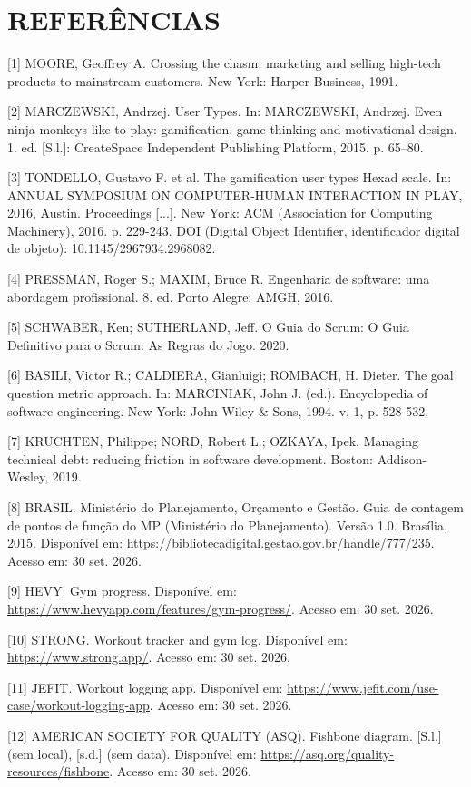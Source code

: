\clearpage
\section*{REFERÊNCIAS}

[1] MOORE, Geoffrey A. Crossing the chasm: marketing and selling high-tech products to mainstream customers. New York: Harper Business, 1991.

[2] MARCZEWSKI, Andrzej. User Types. In: MARCZEWSKI, Andrzej. Even ninja monkeys like to play: gamification, game thinking and motivational design. 1. ed. [S.l.]: CreateSpace Independent Publishing Platform, 2015. p. 65--80.

[3] TONDELLO, Gustavo F. et al. The gamification user types Hexad scale. In: ANNUAL SYMPOSIUM ON COMPUTER-HUMAN INTERACTION IN PLAY, 2016, Austin. Proceedings [...]. New York: ACM (Association for Computing Machinery), 2016. p. 229-243. DOI (Digital Object Identifier, identificador digital de objeto): 10.1145/2967934.2968082.

[4] PRESSMAN, Roger S.; MAXIM, Bruce R. Engenharia de software: uma abordagem profissional. 8. ed. Porto Alegre: AMGH, 2016.

[5] SCHWABER, Ken; SUTHERLAND, Jeff. O Guia do Scrum: O Guia Definitivo para o Scrum: As Regras do Jogo. 2020.

[6] BASILI, Victor R.; CALDIERA, Gianluigi; ROMBACH, H. Dieter. The goal question metric approach. In: MARCINIAK, John J. (ed.). Encyclopedia of software engineering. New York: John Wiley \& Sons, 1994. v. 1, p. 528-532.

[7] KRUCHTEN, Philippe; NORD, Robert L.; OZKAYA, Ipek. Managing technical debt: reducing friction in software development. Boston: Addison-Wesley, 2019.

[8] BRASIL. Ministério do Planejamento, Orçamento e Gestão. Guia de contagem de pontos de função do MP (Ministério do Planejamento). Versão 1.0. Brasília, 2015. Disponível em: \url{https://bibliotecadigital.gestao.gov.br/handle/777/235}. Acesso em: 30 set. 2026.

[9] HEVY. Gym progress. Disponível em: \url{https://www.hevyapp.com/features/gym-progress/}. Acesso em: 30 set. 2026.

[10] STRONG. Workout tracker and gym log. Disponível em: \url{https://www.strong.app/}. Acesso em: 30 set. 2026.

[11] JEFIT. Workout logging app. Disponível em: \url{https://www.jefit.com/use-case/workout-logging-app}. Acesso em: 30 set. 2026.

[12] AMERICAN SOCIETY FOR QUALITY (ASQ). Fishbone diagram. [S.l.] (sem local), [s.d.] (sem data). Disponível em: \url{https://asq.org/quality-resources/fishbone}. Acesso em: 30 set. 2026.
